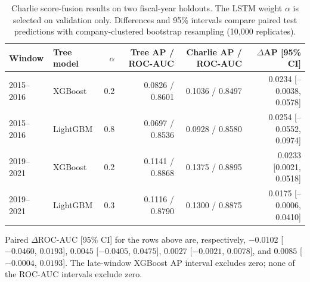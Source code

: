 \begin{table}[t]
\centering
\caption{Charlie score-fusion results on two fiscal-year holdouts. The LSTM weight $\alpha$ is selected on validation only. Differences and 95\% intervals compare paired test predictions with company-clustered bootstrap resampling (10,000 replicates).}
\label{tab:charlie}
\footnotesize
\begin{tabular}{llrrrr}
\toprule
Window & Tree model & $\alpha$ & Tree AP / ROC-AUC & Charlie AP / ROC-AUC & $\Delta$AP [95\% CI] \\
\midrule
2015--2016 & XGBoost & 0.2 & 0.0826 / 0.8601 & 0.1036 / 0.8497 & 0.0234 [--0.0038, 0.0578] \\
2015--2016 & LightGBM & 0.8 & 0.0697 / 0.8536 & 0.0928 / 0.8580 & 0.0254 [--0.0552, 0.0974] \\
2019--2021 & XGBoost & 0.2 & 0.1141 / 0.8868 & 0.1375 / 0.8895 & 0.0233 [0.0021, 0.0518] \\
2019--2021 & LightGBM & 0.3 & 0.1116 / 0.8790 & 0.1300 / 0.8875 & 0.0175 [--0.0006, 0.0410] \\
\bottomrule
\end{tabular}
\vspace{2pt}
\parbox{0.96\textwidth}{\footnotesize Paired $\Delta$ROC-AUC [95\% CI] for the rows above are, respectively, $-0.0102$ [$-0.0460$, $0.0193$], $0.0045$ [$-0.0405$, $0.0475$], $0.0027$ [$-0.0021$, $0.0078$], and $0.0085$ [$-0.0004$, $0.0193$]. The late-window XGBoost AP interval excludes zero; none of the ROC-AUC intervals exclude zero.}
\end{table}
